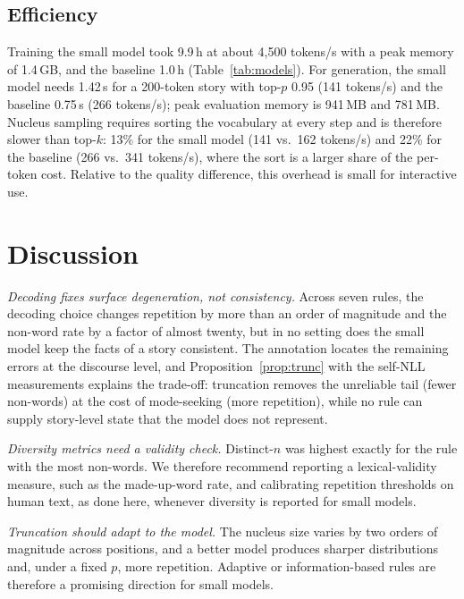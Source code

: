 \documentclass[journal]{IEEEtran}
\begin{document}
\subsection{Efficiency}
\label{sec:efficiency}
Training the small model took 9.9\,h at about 4,500 tokens/s with a peak memory of 1.4\,GB, and the baseline 1.0\,h (Table~\ref{tab:models}). For generation, the small model needs 1.42\,s for a 200-token story with top-$p$ 0.95 (141 tokens/s) and the baseline 0.75\,s (266 tokens/s); peak evaluation memory is 941\,MB and 781\,MB. Nucleus sampling requires sorting the vocabulary at every step and is therefore slower than top-$k$: 13\% for the small model (141 vs.\ 162 tokens/s) and 22\% for the baseline (266 vs.\ 341 tokens/s), where the sort is a larger share of the per-token cost. Relative to the quality difference, this overhead is small for interactive use.

\section{Discussion}
\label{sec:discussion}

\emph{Decoding fixes surface degeneration, not consistency.} Across seven rules, the decoding choice changes repetition by more than an order of magnitude and the non-word rate by a factor of almost twenty, but in no setting does the small model keep the facts of a story consistent. The annotation locates the remaining errors at the discourse level, and Proposition~\ref{prop:trunc} with the self-NLL measurements explains the trade-off: truncation removes the unreliable tail (fewer non-words) at the cost of mode-seeking (more repetition), while no rule can supply story-level state that the model does not represent.

\emph{Diversity metrics need a validity check.} Distinct-$n$ was highest exactly for the rule with the most non-words. We therefore recommend reporting a lexical-validity measure, such as the made-up-word rate, and calibrating repetition thresholds on human text, as done here, whenever diversity is reported for small models.

\emph{Truncation should adapt to the model.} The nucleus size varies by two orders of magnitude across positions, and a better model produces sharper distributions and, under a fixed $p$, more repetition. Adaptive or information-based rules \cite{meister2023typical,hewitt2022truncation} are therefore a promising direction for small models.
\end{document}
